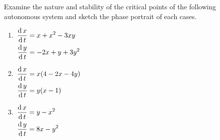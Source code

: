 \documentclass[../main-sheet.tex]{subfiles}
\begin{document}
\begin{prob}
    Examine the nature and stability of the critical points of the following autonomous system and sketch the phase portrait of each cases.
    \begin{enumerate}[label=(\alph*)]
        \item \(\begin{aligned}[t]
            \,\frac{\mathrm{d}\,x}{\mathrm{d}\,t}&=x+x^2-3xy\\
            \,\frac{\mathrm{d}\,y}{\mathrm{d}\,t}&=-2x+y+3y^2
        \end{aligned}\)
        \item \(\begin{aligned}[t]
            \,\frac{\mathrm{d}\,x}{\mathrm{d}\,t}&=x(4-2x-4y)\\
            \,\frac{\mathrm{d}\,y}{\mathrm{d}\,t}&=y(x-1)
        \end{aligned}\)
        \item \(\begin{aligned}[t]
            \,\frac{\mathrm{d}\,x}{\mathrm{d}\,t}&=y-x^2\\
            \,\frac{\mathrm{d}\,y}{\mathrm{d}\,t}&=8x-y^2
        \end{aligned}\)
    \end{enumerate}
\end{prob}
\end{document}
